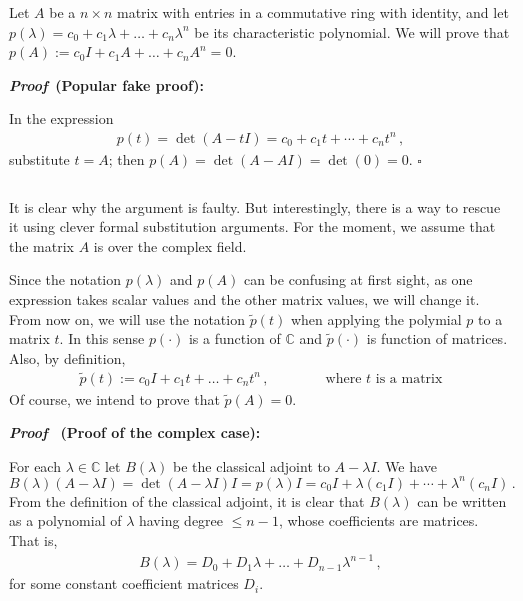 \documentclass[12pt]{article}
\begin{document}

Let $A$ be a $n \times n$ matrix with entries
in a commutative ring with identity, and let $p(\lambda)= c_0 + c_1 \lambda + \dots + c_n \lambda^n$ be its characteristic polynomial.
We will prove that $p(A) := c_0I + c_1 A + \dots + c_n A^n = 0$.

{\bf \emph{Proof}$\,$ (Popular fake proof):}

In the expression
\begin{align*}
p(t) = \det(A - t I) = c_0 + c_1 t + \dotsb + c_n t^n \,,
\end{align*}
substitute $t = A$; then $p(A) = \det(A - AI) = \det (0) = 0$. $\square$

$\,$

It is clear why the argument is faulty.
But interestingly, there is a way to rescue it using clever formal substitution arguments.  For the moment,
we assume that the matrix $A$ is over the complex field.

Since the notation $p(\lambda)$ and $p(A)$ can be confusing at first sight, as one expression takes scalar values and the other matrix values, we will change it. From now on, we will use the notation $\widetilde{p}(t)$ when applying the polymial $p$ to a matrix $t$. In this sense $p(\cdot)$ is a function of $\mathbb{C}$ and $\widetilde{p}(\cdot)$ is function of matrices. Also, by definition,
\begin{align*}
\widetilde{p}(t):= c_0I + c_1 t + \dots + c_n t^n\,, \qquad\qquad \text{where $t$ is a matrix}
\end{align*}
Of course, we intend to prove that $\widetilde{p}(A) = 0$.

{\bf \emph{Proof} $\,$ (Proof of the complex case):}

For each $\lambda \in \mathbb{C}$ let $B(\lambda)$ be the classical adjoint to $A - \lambda I$.
We have
\begin{equation}\label{char-eq}
B(\lambda)(A-\lambda I) = \det(A - \lambda I) I = p(\lambda) I = c_0 I + \lambda (c_1 I) + \dotsb + \lambda^n (c_n I)\,.
\end{equation}
From the definition of the classical adjoint, it is clear
that $B(\lambda)$ can be written as a polynomial of $\lambda$ having degree $\leq n-1$, whose coefficients are matrices.
That is,
\begin{align*}
B(\lambda) = D_0 + D_1 \lambda + \dots + D_{n-1}\lambda^{n-1} \,,
\end{align*}
for some constant coefficient matrices $D_i$.
\end{document}

